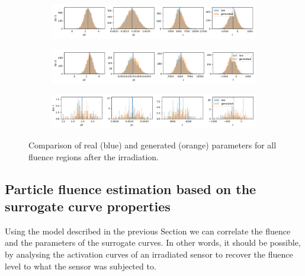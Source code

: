 \begin{figure}[H]
\begin{subfigure}[b]{\textwidth}
  \end{subfigure}
\begin{subfigure}[b]{\textwidth}
    \centering
    \includegraphics[width=\linewidth]{figures/chapter4/surrogates/p3_histos_post_5.png}
  \end{subfigure}
\begin{subfigure}[b]{\textwidth}
    \centering
    \includegraphics[width=\linewidth]{figures/chapter4/surrogates/p3_histos_post_6.png}
  \end{subfigure}
\begin{subfigure}[b]{\textwidth}
    \centering
    \includegraphics[width=\linewidth]{figures/chapter4/surrogates/p3_histos_post_7.png}
  \end{subfigure}

  \caption[model post ir]{Comparison of real (blue) and generated (orange) parameters for all fluence regions after the irradiation.}
    \label{plot:model_s8_post}
\end{figure}


\subsection{Particle fluence estimation based on the surrogate curve properties}

Using the model described in the previous Section we can correlate the fluence and the parameters of the surrogate curves. In other words, it should be possible, by analysing the activation curves of an irradiated sensor to recover the fluence level to what the sensor was subjected to. 

